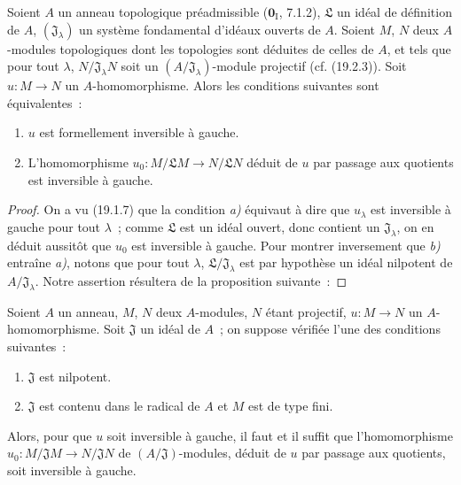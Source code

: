 \begin{proposition}[19.1.9]
\label{0.19.1.9-fr}
Soient $A$ un anneau topologique \textup{préadmissible ($\mathbf{0}_{\mathrm I}$,
7.1.2)}, $\mathfrak L$ un idéal de définition de $A$,
$(\mathfrak J_\lambda)$ un système fondamental d'idéaux ouverts de $A$.
Soient $M$, $N$ deux $A$-modules topologiques dont les topologies sont déduites
de celles de $A$, et tels que pour tout $\lambda$,
$N/\mathfrak J_\lambda N$ soit un $(A/\mathfrak J_\lambda)$-module projectif
\textup{(cf. (19.2.3))}. Soit $u:M\to N$ un $A$-homomorphisme. Alors les conditions
suivantes sont équivalentes~:
\begin{enumerate}
  \item[\textup{a)}] $u$ est formellement inversible à gauche.

  \item[\textup{b)}] L'homomorphisme
  $u_0:M/\mathfrak LM\to N/\mathfrak LN$ déduit de $u$ par passage aux
  quotients est inversible à gauche.
\end{enumerate}
\end{proposition}

\begin{proof}
On a vu (19.1.7) que la condition \emph{a)} équivaut à dire que $u_\lambda$ est
inversible à gauche pour tout $\lambda$~; comme $\mathfrak L$ est un idéal
ouvert, donc contient un $\mathfrak J_\lambda$, on en déduit aussitôt que
$u_0$ est inversible à gauche. Pour montrer inversement que \emph{b)} entraîne \emph{a)},
notons que pour tout $\lambda$, $\mathfrak L/\mathfrak J_\lambda$ est par
hypothèse un idéal nilpotent de $A/\mathfrak J_\lambda$. Notre assertion
résultera de la proposition suivante~:
\end{proof}

\begin{proposition}[19.1.10]
\label{0.19.1.10-fr}
Soient $A$ un anneau, $M$, $N$ deux $A$-modules, $N$ étant projectif,
$u:M\to N$ un $A$-homomorphisme. Soit $\mathfrak J$ un idéal de $A$~; on
suppose vérifiée \textup{l'une} des conditions suivantes~:
\begin{enumerate}
  \item[\textup{(i)}] $\mathfrak J$ est nilpotent.
  \item[\textup{(ii)}] $\mathfrak J$ est contenu dans le radical de $A$ et $M$ est de
  type fini.
\end{enumerate}

Alors, pour que $u$ soit inversible à gauche, il faut et il suffit que
l'homomorphisme
$u_0:M/\mathfrak JM\to N/\mathfrak JN$ de $(A/\mathfrak J)$-modules, déduit
de $u$ par passage aux quotients, soit inversible à gauche.
\end{proposition}

